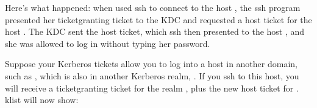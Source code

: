 \documentclass[letterpaper,10pt,english]{sphinxmanual}
\begin{document}
\begin{sphinxVerbatim}[commandchars=\\\{\}]
 
  
  

                   
      
      
\end{sphinxVerbatim}

\sphinxAtStartPar
Here’s what happened: when  used ssh to connect to the
host , the ssh program presented her
ticket\sphinxhyphen{}granting ticket to the KDC and requested a host ticket for the
host .  The KDC sent the host ticket, which ssh
then presented to the host , and she was allowed
to log in without typing her password.

\sphinxAtStartPar
Suppose your Kerberos tickets allow you to log into a host in another
domain, such as , which is also in another
Kerberos realm, .  If you ssh to this host, you will
receive a ticket\sphinxhyphen{}granting ticket for the realm , plus
the new host ticket for .  klist will now
show:
\end{document}
